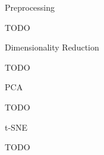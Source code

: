 \chap Preprocessing

TODO

\sec Dimensionality Reduction

TODO

\secc PCA

TODO

\secc t-SNE

TODO

